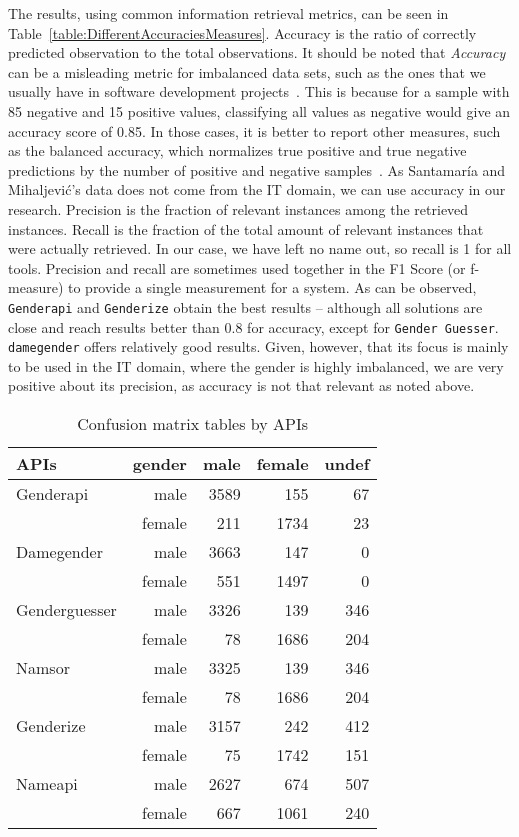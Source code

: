 \documentclass[a4paper]{article}
\begin{document}
The results, using common information retrieval metrics, can be seen in Table~\ref{table:DifferentAccuraciesMeasures}.
Accuracy is the ratio of correctly predicted observation to the total observations.
It should be noted that \emph{Accuracy} can be a misleading metric for imbalanced data sets, such as the ones that we usually have in software development projects~\cite{ghosh2002free}.
This is because for a sample with 85 negative and 15 positive values, classifying all values as negative would give an accuracy score of 0.85.
In those cases, it is better to report other measures, such as the balanced accuracy, which normalizes true positive and true negative predictions by the number of positive and negative samples~\cite{mower2005prep}.
As Santamaría and Mihaljevi\'c's data does not come from the IT domain, we can use accuracy in our research.
Precision is the fraction of relevant instances among the retrieved instances.
Recall is the fraction of the total amount of relevant instances that were actually retrieved.
In our case, we have left no name out, so recall is 1 for all tools.
Precision and recall are sometimes used together in the F1 Score (or f-measure) to provide a single measurement for a system.
As can be observed, \texttt{Genderapi} and \texttt{Genderize} obtain the best results -- although all solutions are close and reach results better than 0.8 for accuracy, except for \texttt{Gender Guesser}.
\texttt{damegender} offers relatively good results.
Given, however, that its focus is mainly to be used in the IT domain, where the gender is highly imbalanced, we are very positive about its precision, as accuracy is not that relevant as noted above.




\begin{table}[t]
\footnotesize
\begin{tabular}[]{lrrrr}
  \hline
  APIs          & gender & male & female & undef \tabularnewline
\hline
Genderapi         & male    & 3589 & 155  &  67 \tabularnewline
                  & female  & 211  & 1734 &  23 \tabularnewline
Damegender       & male    & 3663 & 147  &   0 \tabularnewline
                & female  & 551  & 1497 &   0 \tabularnewline
Genderguesser     & male    & 3326 &  139 & 346 \tabularnewline
                  & female  & 78   & 1686 & 204 \tabularnewline
Namsor            & male    & 3325 & 139  & 346 \tabularnewline
                  & female  & 78   & 1686 & 204 \tabularnewline
Genderize         & male    & 3157 & 242  & 412 \tabularnewline
                  & female  & 75   & 1742 & 151 \tabularnewline
Nameapi           & male    & 2627 & 674  & 507 \tabularnewline
                  & female  & 667  & 1061 & 240 \tabularnewline 
\hline
\end{tabular}
\caption{Confusion matrix tables by APIs}
\label{table:ConfusionMatrixTables}
\end{table}
\end{document}
